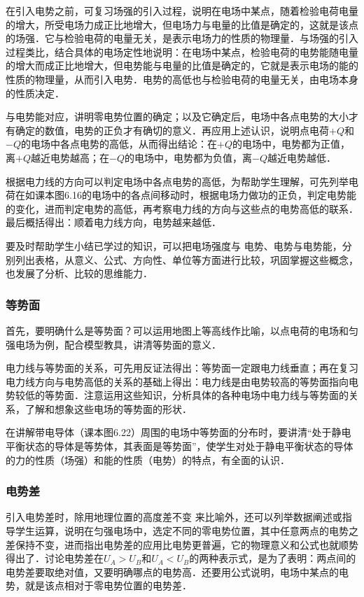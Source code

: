 在引入电势之前，可复习场强的引入过程，说明在电场中某点，随着检验电荷电量的增大，所受电场力成正比地增大，但电场力与电量的比值是确定的，这就是该点的场强．它与检验电荷的电量无关，是表示电场力的性质的物理量．与场强的引入过程类比，结合具体的电场定性地说明：在电场中某点，检验电荷的电势能随电量的增大而成正比地增大，但电势能与电量的比值是确定的，它就是表示电场的能的性质的物理量，从而引入电势．电势的高低也与检验电荷的电量无关，由电场本身的性质决定．

与电势能对应，讲明零电势位置的确定；以及它确定后，电场中各点电势的大小才有确定的数值，电势的正负才有确切的意义．再应用上述认识，说明点电荷$+Q$和$-Q$的电场中各点电势的高低，从而得出结论：在$+Q$的电场中，电势都为正值，离$+Q$越近电势越高；在$-Q$的电场中，电势都为负值，离$-Q$越近电势越低．

根据电力线的方向可以判定电场中各点电势的高低，为帮助学生理解，可先列举电荷在如课本图6.16的电场中的各点间移动时，根据电场力做功的正负，判定电势能的变化，进而判定电势的高低，再考察电力线的方向与这些点的电势高低的联系．最后概括得出：顺着电力线方向，电势越来越低．

要及时帮助学生小结已学过的知识，可以把电场强度与
电势、电势与电势能，分别列出表格，从意义、公式、方向性、单位等方面进行比较，巩固掌握这些概念，也发展了分析、比较的思维能力．

\subsubsection{等势面}

首先，要明确什么是等势面？可以运用地图上等高线作比喻，以点电荷的电场和匀强电场为例，配合模型教具，讲清等势面的意义．

电力线与等势面的关系，可先用反证法得出：等势面一定跟电力线垂直；再在复习电力线方向与电势高低的关系的基础上得出：电力线是由电势较高的等势面指向电势较低的等势面．注意运用这些知识，分析具体的各种电场中电力线与等势面的关系，了解和想象这些电场的等势面的形状．

在讲解带电导体（课本图6.22）周围的电场中等势面的分布时，要讲清“处于静电平衡状态的导体是等势体，其表面是等势面”，使学生对处于静电平衡状态的导体的力的性质（场强）和能的性质（电势）的特点，有全面的认识．

\subsubsection{电势差}

引入电势差时，除用地理位置的高度差不变
来比喻外，还可以列举数据阐述或指导学生运算，说明在匀强电场中，选定不同的零电势位置，其中任意两点的电势之差保持不变，进而指出电势差的应用比电势更普遍，它的物理意义和公式也就顺势得出了．讨论电势差在$U_A>U_B$和$U_A<U_B$的两种表示式，是为了表明：两点间的电势差要取绝对值，又要明确哪点的电势高．还要用公式说明，电场中某点的电势，就是该点相对于零电势位置的电势差．

